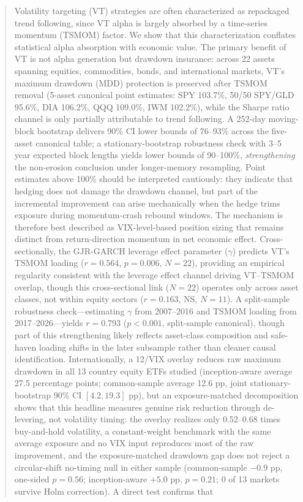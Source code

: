 
\begin{abstract}
\noindent
Volatility targeting (VT) strategies are often characterized as repackaged trend following, since VT alpha is largely absorbed by a time-series momentum (TSMOM) factor. We show that this characterization conflates statistical alpha absorption with economic value. The primary benefit of VT is not alpha generation but drawdown insurance: across 22 assets spanning equities, commodities, bonds, and international markets, VT's maximum drawdown (MDD) protection is preserved after TSMOM removal (5-asset canonical point estimates: SPY 103.7\%, 50/50 SPY/GLD 95.6\%, DIA 106.2\%, QQQ 109.0\%, IWM 102.2\%), while the Sharpe ratio channel is only partially attributable to trend following. A 252-day moving-block bootstrap delivers 90\% CI lower bounds of 76--93\% across the five-asset canonical table; a stationary-bootstrap robustness check with 3--5 year expected block lengths yields lower bounds of 90--100\%, \emph{strengthening} the non-erosion conclusion under longer-memory resampling. Point estimates above 100\% should be interpreted cautiously: they indicate that hedging does not damage the drawdown channel, but part of the incremental improvement can arise mechanically when the hedge trims exposure during momentum-crash rebound windows. The mechanism is therefore best described as VIX-level-based position sizing that remains distinct from return-direction momentum in net economic effect. Cross-sectionally, the GJR-GARCH leverage effect parameter ($\gamma$) predicts VT's TSMOM loading ($r = 0.564$, $p = 0.006$, $N = 22$), providing an empirical regularity consistent with the leverage effect channel driving VT--TSMOM overlap, though this cross-sectional link ($N = 22$) operates only across asset classes, not within equity sectors ($r = 0.163$, NS, $N = 11$). A split-sample robustness check---estimating $\gamma$ from 2007--2016 and TSMOM loading from 2017--2026---yields $r = 0.793$ ($p < 0.001$, split-sample canonical), though part of this strengthening likely reflects asset-class composition and safe-haven loading shifts in the later subsample rather than cleaner causal identification. Internationally, a 12/VIX overlay reduces raw maximum drawdown in all 13 country equity ETFs studied (inception-aware average 27.5 percentage points; common-sample average 12.6 pp, joint stationary-bootstrap 90\% CI $[4.2, 19.3]$ pp), but an exposure-matched decomposition shows that this headline measures genuine risk reduction through de-levering, not volatility timing: the overlay realizes only 0.52--0.68 times buy-and-hold volatility, a constant-weight benchmark with the same average exposure and no VIX input reproduces most of the raw improvement, and the exposure-matched drawdown gap does not reject a circular-shift no-timing null in either sample (common-sample $-0.9$ pp, one-sided $p = 0.56$; inception-aware $+5.0$ pp, $p = 0.21$; 0 of 13 markets survive Holm correction). A direct test confirms that 
\end{abstract}
